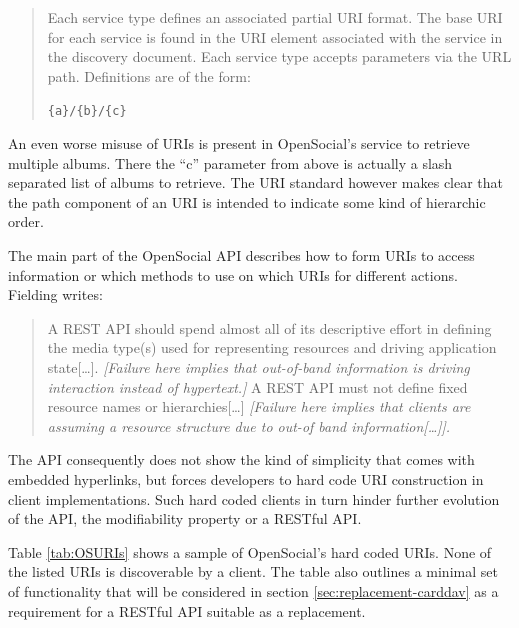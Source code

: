 \documentclass[11pt,a4paper,headsepline,twoside]{scrartcl}		%
\newcommand{\citeurl}[2]{\url{#1} (#2)}
\begin{document}
\begin{quote}
  Each service type defines an associated partial URI format. The base URI for
  each service is found in the URI element associated with the service in the
  discovery document. Each service type accepts parameters via the URL
  path. Definitions are of the form:
  
  \lstinline:{a}/{b}/{c}:
\end{quote}

An even worse misuse of URIs is present in OpenSocial's service to retrieve
multiple albums. There the ``c'' parameter from above is actually a slash
separated list of albums to retrieve. The URI standard however makes clear that
the path component of an URI is intended to indicate some kind of hierarchic
order\cite[sec 3.3]{RFC3986}.


The main part of the OpenSocial API describes how to form URIs to access
information or which methods to use on which URIs for different
actions. Fielding writes:

\begin{quote}
  A REST API should spend almost all of its descriptive effort in defining the
  media type(s) used for representing resources and driving application
  state[\ldots].  \textit{[Failure here implies that out-of-band information is
    driving interaction instead of hypertext.]}  A REST API must not define
  fixed resource names or hierarchies[\ldots] \textit{[Failure here implies that
    clients are assuming a resource structure due to out-of band
    information[\ldots]].}
\end{quote}

The API consequently does not show the kind of simplicity that comes with
embedded hyperlinks, but forces developers to hard code URI construction in
client implementations. Such hard coded clients in turn hinder further evolution
of the API, the modifiability property or a RESTful API\cite[sec
2.3]{Fielding2000}.

Table \ref{tab:OSURIs} shows a sample of OpenSocial's hard coded URIs. None
of the listed URIs is discoverable by a client. The table also outlines a minimal
set of functionality that will be considered in section
\ref{sec:replacement-carddav} as a requirement for a RESTful API suitable as a
replacement.
\end{document}
